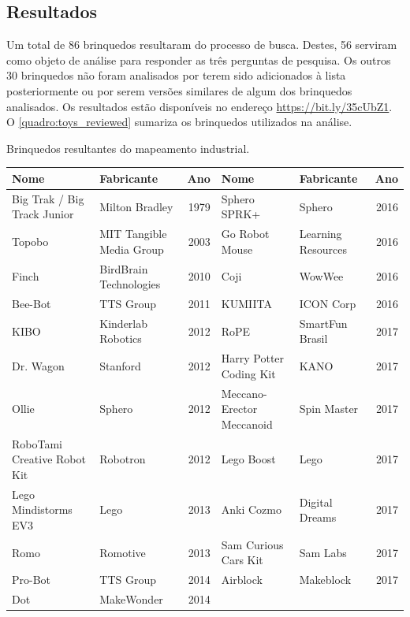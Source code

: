 \subsection{Resultados}
Um total de 86 brinquedos resultaram do processo de busca. Destes, 56 serviram como objeto de análise para responder as três perguntas de pesquisa. Os outros 30 brinquedos não foram analisados por terem sido adicionados à lista posteriormente ou por serem versões similares de algum dos brinquedos analisados. Os resultados estão disponíveis no endereço \url{https://bit.ly/35cUbZ1}. O \autoref{quadro:toys_reviewed} sumariza os brinquedos utilizados na análise.
\begin{landscape}
\linespread{1}
\begin{quadro}
 \caption{Brinquedos resultantes do mapeamento industrial.}
 \label{quadro:toys_reviewed}
\end{quadro}
\begin{small}
\begin{longtable}{|p{4.5cm} p{4.5cm} r| p{4.5cm} p{4.5cm} r|}
    \hline
    Nome & Fabricante & Ano & Nome & Fabricante & Ano \\ \hline
    Big Trak / Big Track Junior & Milton Bradley & 1979 &
    Sphero SPRK+ & Sphero & 2016 \\ \hline
    Topobo & MIT Tangible Media Group & 2003 &
    Go Robot Mouse & Learning Resources & 2016 \\ \hline
    Finch & BirdBrain Technologies & 2010 &
    Coji & WowWee & 2016 \\ \hline
    Bee-Bot & TTS Group & 2011 &
    KUMIITA & ICON Corp & 2016 \\ \hline
    KIBO & Kinderlab Robotics & 2012 &
    RoPE & SmartFun Brasil & 2017 \\ \hline
    Dr. Wagon & Stanford & 2012 &
    Harry Potter Coding Kit & KANO & 2017 \\ \hline
    Ollie & Sphero & 2012 &
    Meccano-Erector Meccanoid & Spin Master & 2017 \\ \hline
    RoboTami Creative Robot Kit & Robotron & 2012 &
    Lego Boost & Lego & 2017 \\ \hline
    Lego Mindistorms EV3 & Lego & 2013 &
    Anki Cozmo & Digital Dreams & 2017 \\ \hline
    Romo & Romotive & 2013 &
    Sam Curious Cars Kit & Sam Labs & 2017 \\ \hline
    Pro-Bot & TTS Group & 2014 &
    Airblock & Makeblock & 2017 \\ \hline
    Dot & MakeWonder & 2014 &

\end{longtable}
\end{small}
\end{landscape}
